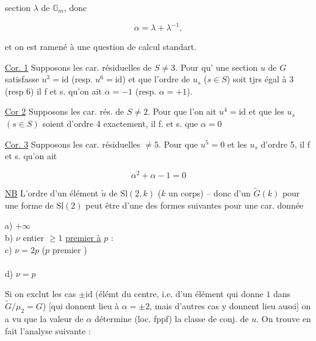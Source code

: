 section $\lambda$ de $\mathbb G_m$, donc \deleted{\unsure{$\alpha$|$*$}}

\[
\alpha=\lambda+\lambda^{-1},
\]

et on est ramené à une question de calcul
standart.


\uline{Cor. 1} Supposons les car. résiduelles de $S\ne3$. Pour qu'
une section $u$ de $G$ satisfasse $u^3=\mathrm{id}$ (resp. $u^6=\mathrm{id}$) et que
l'ordre de $u_s$ ($s\in S$) soit tjrs égal à 3 (resp 6) il f et s.
qu'on ait $\alpha=-1$ (resp. $\alpha=+1$).


\uline{Cor 2} Supposons les car. rés. de $S\ne2$. Pour que l'on
ait $u^4=\mathrm{id}$ et que les $u_s$ $(s\in S)$ soient d'ordre 4 exactement,
il f. et s. que $\alpha=0$

\uline{Cor. 3} Supposons les car. résiduelles $\ne5$. Pour que
$u^5=0$ et les $u_s$ d'ordre 5, il f et s. qu'on ait

\[
\alpha^2+\alpha-1=0
\]

\uline{NB} L'ordre \inserted{$\nu$} d'un élément $\tilde u$ de $\mathrm{Sl}(2,k)$ ($k$ un corps)
-- donc d'un $\widetilde G(k)$ pour une forme  de $\mathrm{Sl}(2)$ 
 peut être d'une des formes suivantes 
pour une car. donnée

a) \inserted{$\nu=$} $+\infty$\\ 
b) $\nu$ entier $\geq1$ \uline{premier à} $p$ :\\ 
c) $\nu=2p$ ($p$ premier )\\ 
\\ 
d) $\nu=p$

Si on exclut les cas $\pm\mathrm{id}$ (élémt du centre, i.e.
d'un élément qui donne $1$ dans $\widetilde G/\mu_2=G$)
[qui donnent lieu à $\alpha=\pm2$, mais d'autres cas y
donnent lieu aussi] on a vu que la valeur
de $\alpha$ détermine (loc. fppf) la classe de conj. de
$u$. On trouve en fait l'analyse suivante :

